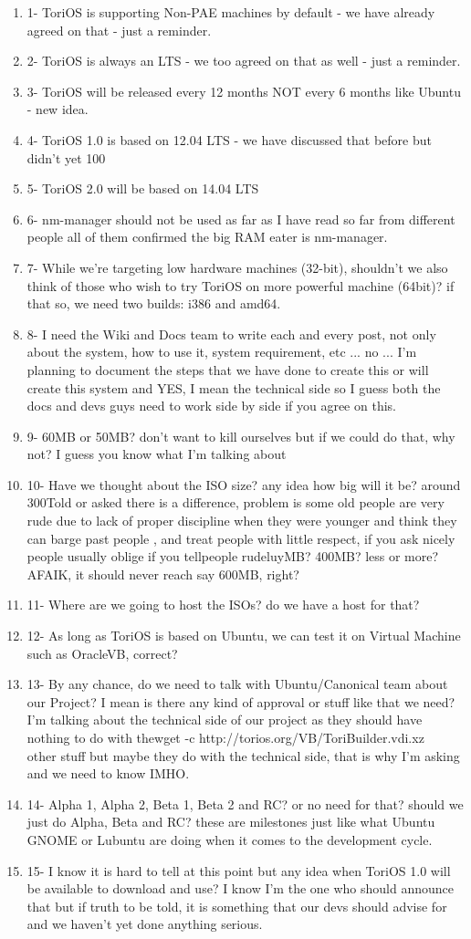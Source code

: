 \documentclass[12pt,a4paper]{book}
\begin{document}
\begin{enumerate}
\item 1- ToriOS is supporting Non-PAE machines by default - we have already agreed on that - just a reminder.
\item 2- ToriOS is always an LTS - we too agreed on that as well - just a reminder.
\item3- ToriOS will be released every 12 months NOT every 6 months like Ubuntu - new idea.
\item4- ToriOS 1.0 is based on 12.04 LTS - we have discussed that before but didn't yet 100%
\item5- ToriOS 2.0 will be based on 14.04 LTS
\item6- nm-manager should not be used as far as I have read so far from different people all of them confirmed the big RAM eater is nm-manager.
\item7- While we're targeting low hardware machines (32-bit), shouldn't we also think of those who wish to try ToriOS on more powerful machine (64bit)? if that so, we need two builds: i386 and amd64.
\item8- I need the Wiki and Docs team to write each and every post, not only about the system, how to use it, system requirement, etc ... no ... I'm planning to document the steps that we have done to create this or will create this system and YES, I mean the technical side so I guess both the docs and devs guys need to work side by side if you agree on this.
\item9- 60MB or 50MB? don't want to kill ourselves but if we could do that, why not? I guess you know what I'm talking about
\item 10- Have we thought about the ISO size? any idea how big will it be? around 300Told or asked there is a difference,  problem is some old people are very rude due to lack of proper discipline when they were younger and think they can barge past people , and treat people with little respect,  if you ask nicely people usually oblige if you tellpeople rudeluyMB? 400MB? less or more? AFAIK, it should never reach say 600MB, right?
\item 11- Where are we going to host the ISOs? do we have a host for that?
\item 12- As long as ToriOS is based on Ubuntu, we can test it on Virtual Machine such as OracleVB, correct?
\item 13- By any chance, do we need to talk with Ubuntu/Canonical team about our Project? I mean is there any kind of approval or stuff like that we need? I'm talking about the technical side of our project as they should have nothing to do with thewget -c http://torios.org/VB/ToriBuilder.vdi.xz \\ other stuff but maybe they do with the technical side, that is why I'm asking and we need to know IMHO.
\item 14- Alpha 1, Alpha 2, Beta 1, Beta 2 and RC? or no need for that? should we just do Alpha, Beta and RC? these are milestones just like what Ubuntu GNOME or Lubuntu are doing when it comes to the development cycle.
\item 15- I know it is hard to tell at this point but any idea when ToriOS 1.0 will be available to download and use? I know I'm the one who should announce that but if truth to be told, it is something that our devs should advise for and we haven't yet done anything serious. 
\end{enumerate}
\end{document}
